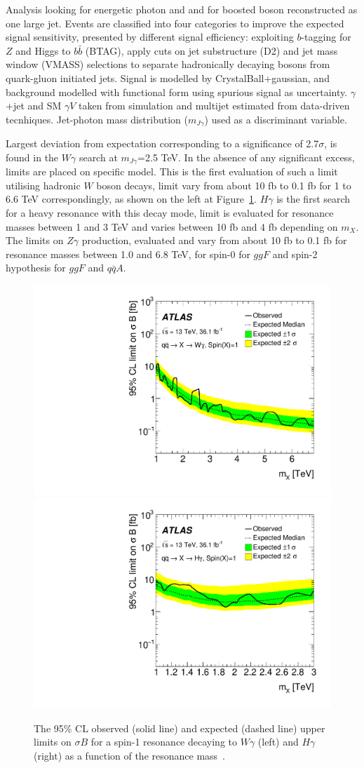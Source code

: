 \documentclass{PoS}
\begin{document}
Analysis looking for energetic photon and and for boosted boson reconstructed as one large jet.
Events are classified into four categories to improve the expected signal sensitivity, presented by different signal efficiency:
exploiting $b$-tagging for $Z$ and Higgs to $b\bar{b}$ (BTAG), apply cuts on jet substructure (D2) and jet mass window (VMASS) selections to separate hadronically decaying bosons from quark-gluon initiated jets.
Signal is modelled by CrystalBall+gaussian, and background modelled with functional form using spurious signal as uncertainty. $\gamma$+jet and SM $\gamma V$ taken from simulation and multijet estimated from data-driven tecnhiques.
Jet-photon mass distribution ($m_{J \gamma}$) used as a discriminant variable. %

Largest deviation from expectation corresponding to a significance of 2.7$\sigma$, is found in the $W\gamma$ search at $m_{J \gamma}$=2.5 TeV.
In the absence of any significant excess, limits are placed on specific model.
This is the first evaluation of such a limit utilising hadronic $W$ boson decays, limit vary from about 10 fb to 0.1 fb for 1 to 6.6 TeV correspondingly, as shown on the left at Figure~\ref{fig:Wg_lim}. 
$H\gamma$ is the first search for a heavy resonance with this decay mode, limit is evaluated for resonance masses between 1 and 3 TeV and varies between 10 fb and 4 fb depending on $m_X$.
The limits on $Z\gamma$ production, evaluated and vary from about 10 fb to 0.1 fb for resonance masses between 1.0 and 6.8 TeV, for spin-0 for $ggF$ and spin-2 hypothesis for $ggF$ and $q\bar{q}A$.

 \begin{figure}
     \includegraphics[width=.5\textwidth]{figures/lim_Wg_qqA1}
     \includegraphics[width=.5\textwidth]{figures/lim_Hg_qqA1}
     \caption{The 95\% CL observed (solid line) and expected (dashed line) upper limits on $\sigma B$ for a spin-1 resonance decaying to $W\gamma$ (left) and $H\gamma$ (right) as a function of the resonance mass~\cite{EXOT-2016-30}.}
     \label{fig:Wg_lim}
     \end{figure}
\end{document}
